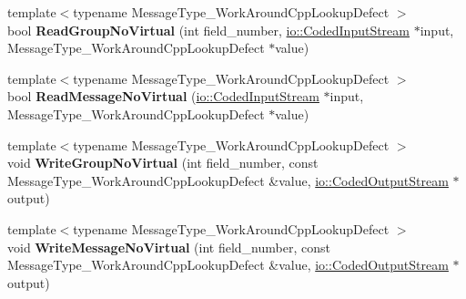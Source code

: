 \begin{DoxyCompactItemize}
\item 
\mbox{\label{classgoogle_1_1protobuf_1_1internal_1_1WireFormatLite_a36ab0c237b9fed07bb5340bce4d0894b}} 
{\footnotesize template$<$typename Message\+Type\+\_\+\+Work\+Around\+Cpp\+Lookup\+Defect $>$ }\\bool {\bfseries Read\+Group\+No\+Virtual} (int field\+\_\+number, \hyperlink{classgoogle_1_1protobuf_1_1io_1_1CodedInputStream}{io\+::\+Coded\+Input\+Stream} $\ast$input, Message\+Type\+\_\+\+Work\+Around\+Cpp\+Lookup\+Defect $\ast$value)
\item 
\mbox{\label{classgoogle_1_1protobuf_1_1internal_1_1WireFormatLite_a816784413ce744b217f6b4e2092c7f96}} 
{\footnotesize template$<$typename Message\+Type\+\_\+\+Work\+Around\+Cpp\+Lookup\+Defect $>$ }\\bool {\bfseries Read\+Message\+No\+Virtual} (\hyperlink{classgoogle_1_1protobuf_1_1io_1_1CodedInputStream}{io\+::\+Coded\+Input\+Stream} $\ast$input, Message\+Type\+\_\+\+Work\+Around\+Cpp\+Lookup\+Defect $\ast$value)
\item 
\mbox{\label{classgoogle_1_1protobuf_1_1internal_1_1WireFormatLite_a9c467e70e559b8fc5e55457ff97fe225}} 
{\footnotesize template$<$typename Message\+Type\+\_\+\+Work\+Around\+Cpp\+Lookup\+Defect $>$ }\\void {\bfseries Write\+Group\+No\+Virtual} (int field\+\_\+number, const Message\+Type\+\_\+\+Work\+Around\+Cpp\+Lookup\+Defect \&value, \hyperlink{classgoogle_1_1protobuf_1_1io_1_1CodedOutputStream}{io\+::\+Coded\+Output\+Stream} $\ast$output)
\item 
\mbox{\label{classgoogle_1_1protobuf_1_1internal_1_1WireFormatLite_a8ca9244163ab9d2179bf24e8a42754d6}} 
{\footnotesize template$<$typename Message\+Type\+\_\+\+Work\+Around\+Cpp\+Lookup\+Defect $>$ }\\void {\bfseries Write\+Message\+No\+Virtual} (int field\+\_\+number, const Message\+Type\+\_\+\+Work\+Around\+Cpp\+Lookup\+Defect \&value, \hyperlink{classgoogle_1_1protobuf_1_1io_1_1CodedOutputStream}{io\+::\+Coded\+Output\+Stream} $\ast$output)
\item 
\mbox{\label{classgoogle_1_1protobuf_1_1internal_1_1WireFormatLite_a6fe2b3793868f16f51001b81e20d64f9}} 

\end{DoxyCompactItemize}
